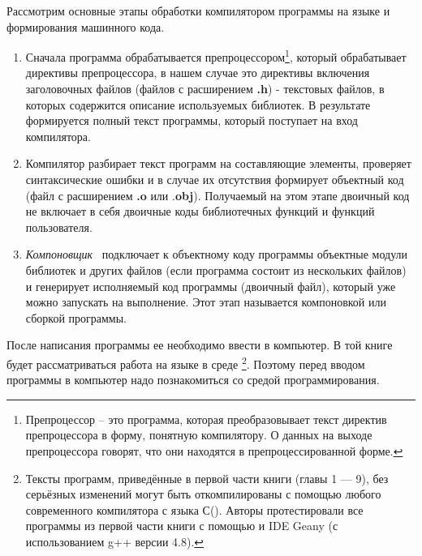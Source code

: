 Рассмотрим основные этапы обработки компилятором программы на языке  и формирования машинного кода.

\begin{enumerate}
\item Сначала программа обрабатывается препроцессором\footnote{Препроцессор – это программа, которая преобразовывает
текст директив препроцессора в форму, понятную компилятору. О данных на выходе препроцессора говорят, что они находятся
в препроцессированной форме.}, который обрабатывает директивы препроцессора, в нашем случае это директивы включения
заголовочных файлов (файлов с расширением \textbf{.h}) - текстовых файлов, в которых содержится описание используемых
библиотек. В результате формируется полный текст программы, который поступает на вход компилятора. 
\item Компилятор разбирает текст программ на составляющие элементы, проверяет синтаксические ошибки и в случае их
отсутствия формирует объектный код (файл с расширением \textbf{.o} или .\textbf{obj}). Получаемый на этом этапе
двоичный код не включает в себя двоичные коды библиотечных функций и функций пользователя.
\item \textit{Компоновщик}%
%
~подключает к объектному коду программы объектные модули библиотек и других файлов (если программа состоит из нескольких
файлов) и генерирует исполняемый код программы (двоичный файл), который уже можно запускать на выполнение. Этот этап
называется компоновкой или сборкой программы.
\end{enumerate}
После написания программы ее необходимо ввести в компьютер. В той книге будет рассматриваться работа на языке  в
среде \footnote{Тексты программ, приведённые в первой части книги (главы 1 — 9), без серьёзных изменений
могут быть откомпилированы с помощью любого современного компилятора с языка С(). Авторы протестировали все
программы из первой части книги с помощью   и IDE Geany (с использованием g++ версии 4.8).}. Поэтому перед
вводом программы в компьютер надо познакомиться со средой программирования.

